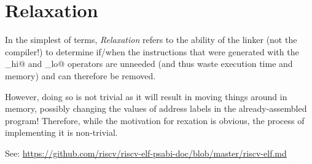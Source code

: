 \section{Relaxation}

%
In the simplest of terms, {\em Relaxation} refers to the ability of the 
linker (not the compiler!) to determine if/when the instructions that
were generated with the \verb@xxx_hi@ and \verb@xxx_lo@ operators are
unneeded (and thus waste execution time and memory) and can therefore
be removed.

However, doing so is not trivial as it will result in moving things around 
in memory, possibly changing the values of address labels in the 
already-assembled program!  Therefore, while the motivation for 
rexation is obvious, the process of implementing it is non-trivial.

See: \url{https://github.com/riscv/riscv-elf-psabi-doc/blob/master/riscv-elf.md}
